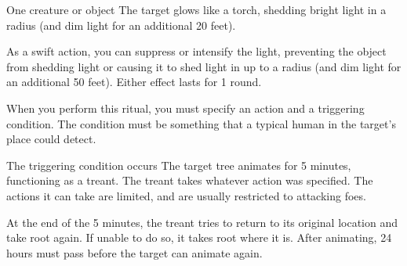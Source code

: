 \spellrng{\rngtouch}
\spelldur{\durlong \dismissable}
\begin{spelltarget}{One creature or object}
    \spelleffect The target glows like a torch, shedding bright light in a \areamed radius (and dim light for an additional 20 feet).

    As a swift action, you can suppress or intensify the light, preventing the object from shedding light or causing it to shed light in up to a \arealarge radius (and dim light for an additional 50 feet). Either effect lasts for 1 round.
\end{spelltarget}

\spellspecial When you perform this ritual, you must specify an action and a triggering condition. The condition must be something that a typical human in the target's place could detect.
\begin{spelltrigger}{The triggering condition occurs}
    \spelleffect The target tree animates for 5 minutes, functioning as a treant. The treant takes whatever action was specified. The actions it can take are limited, and are usually restricted to attacking foes.

    At the end of the 5 minutes, the treant tries to return to its original location and take root again. If unable to do so, it takes root where it is. After animating, 24 hours must pass before the target can animate again.
\end{spelltrigger}

